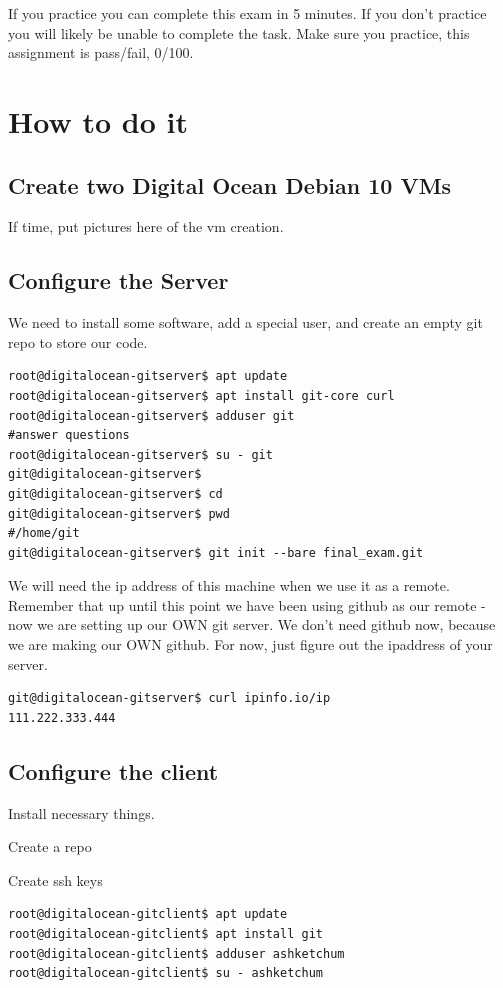 \documentclass[10pt]{article}
\begin{document}
If you practice you can complete this exam in 5 minutes. If you don't practice
you will likely be unable to complete the task. Make sure you practice, this
assignment is pass/fail, 0/100.

\section{How to do it}
\subsection{Create two Digital Ocean Debian 10 VMs}
If time, put pictures here of the vm creation.

\subsection{Configure the Server}

We need to install some software, add a special user, and create an empty git
repo to store our code.
\begin{lstlisting}
root@digitalocean-gitserver$ apt update
root@digitalocean-gitserver$ apt install git-core curl
root@digitalocean-gitserver$ adduser git
#answer questions
root@digitalocean-gitserver$ su - git
git@digitalocean-gitserver$
git@digitalocean-gitserver$ cd
git@digitalocean-gitserver$ pwd
#/home/git
git@digitalocean-gitserver$ git init --bare final_exam.git
\end{lstlisting}

We will need the ip address of this machine when we use it as a remote. Remember
that up until this point we have been using github as our remote - now we are
setting up our OWN git server. We don't need github now, because we are making
our OWN github. For now, just figure out the ipaddress of your server.

\begin{lstlisting}
git@digitalocean-gitserver$ curl ipinfo.io/ip
111.222.333.444
\end{lstlisting}


\subsection{Configure the client}
Install necessary things. 

Create a repo

Create ssh keys

\begin{lstlisting}
root@digitalocean-gitclient$ apt update
root@digitalocean-gitclient$ apt install git
root@digitalocean-gitclient$ adduser ashketchum
root@digitalocean-gitclient$ su - ashketchum
\end{lstlisting}
\end{document}
